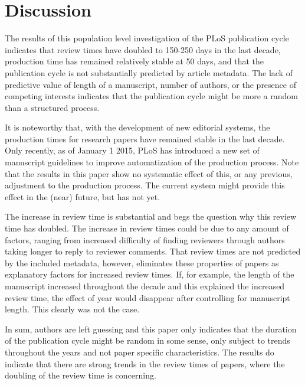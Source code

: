 \section*{Discussion}
The results of this population level investigation of the PLoS publication cycle indicates that review times have doubled to 150-250 days in the last decade, production time has remained relatively stable at 50 days, and that the publication cycle is not substantially predicted by article metadata. The lack of predictive value of length of a manuscript, number of authors, or the presence of competing interests indicates that the publication cycle might be more a random than a structured process. 

It is noteworthy that, with the development of new editorial systems, the production times for research papers have remained stable in the last decade. Only recently, as of January 1 2015, PLoS has introduced a new set of manuscript guidelines to improve automatization of the production process. Note that the results in this paper show no systematic effect of this, or any previous, adjustment to the production process. The current system might provide this effect in the (near) future, but has not yet.

The increase in review time is substantial and begs the question why this review time has doubled. The increase in review times could be due to any amount of factors, ranging from increased difficulty of finding reviewers through authors taking longer to reply to reviewer comments. That review times are not predicted by the included metadata, however, eliminates these properties of papers as explanatory factors for increased review times. If, for example, the length of the manuscript increased throughout the decade and this explained the increased review time, the effect of year would disappear after controlling for manuscript length. This clearly was not the case.

In sum, authors are left guessing and this paper only indicates that the duration of the publication cycle might be random in some sense, only subject to trends throughout the years and not paper specific characteristics. The results do indicate that there are strong trends in the review times of papers, where the doubling of the review time is concerning.